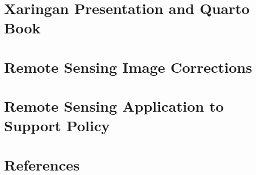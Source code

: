 \documentclass[
  letterpaper,
  DIV=11,
  numbers=noendperiod]{scrreprt}
\newlength{\cslhangindent}
\newenvironment{CSLReferences}[2] %
 {\begin{list}{}{%
  \setlength{\itemindent}{0pt}
  \setlength{\leftmargin}{0pt}
  \setlength{\parsep}{0pt}
  \ifodd #1
   \setlength{\leftmargin}{\cslhangindent}
   \setlength{\itemindent}{-1\cslhangindent}
  \fi
  \setlength{\itemsep}{#2\baselineskip}}}
 {\end{list}}
\begin{document}
\chapter{Xaringan Presentation and Quarto
Book}\label{xaringan-presentation-and-quarto-book}


\chapter{Remote Sensing Image
Corrections}\label{remote-sensing-image-corrections}


\chapter{Remote Sensing Application to Support
Policy}\label{remote-sensing-application-to-support-policy}


\chapter*{References}\label{references}


\label{refs}
\begin{CSLReferences}{0}{1}
\end{CSLReferences}
\end{document}

